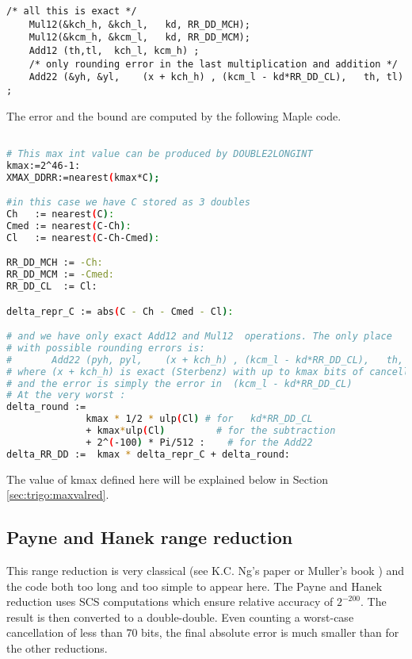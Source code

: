 \begin{lstlisting}[caption={Cody and Waite range reduction in
    double-double},firstnumber=20]
    /* all this is exact */
    Mul12(&kch_h, &kch_l,   kd, RR_DD_MCH);
    Mul12(&kcm_h, &kcm_l,   kd, RR_DD_MCM);
    Add12 (th,tl,  kch_l, kcm_h) ;
    /* only rounding error in the last multiplication and addition */ 
    Add22 (&yh, &yl,    (x + kch_h) , (kcm_l - kd*RR_DD_CL),   th, tl) ;
\end{lstlisting}


The error and the bound are computed by the following Maple code.

\begin{lstlisting}[caption={Maple script for computing constants for Cody and Waite
    double-double\label{trigo:lst:cwddrmaple}},
  language={sh}, numbers=none]% of course it's maple
%Skip a line here, I don't know why, otherwise latex eats the first line

# This max int value can be produced by DOUBLE2LONGINT
kmax:=2^46-1:
XMAX_DDRR:=nearest(kmax*C);

#in this case we have C stored as 3 doubles
Ch   := nearest(C):
Cmed := nearest(C-Ch):
Cl   := nearest(C-Ch-Cmed):

RR_DD_MCH := -Ch:
RR_DD_MCM := -Cmed:
RR_DD_CL  := Cl:

delta_repr_C := abs(C - Ch - Cmed - Cl):

# and we have only exact Add12 and Mul12  operations. The only place
# with possible rounding errors is:
#       Add22 (pyh, pyl,    (x + kch_h) , (kcm_l - kd*RR_DD_CL),   th, tl) ;
# where (x + kch_h) is exact (Sterbenz) with up to kmax bits of cancellation
# and the error is simply the error in  (kcm_l - kd*RR_DD_CL)
# At the very worst :
delta_round :=
              kmax * 1/2 * ulp(Cl) # for   kd*RR_DD_CL
              + kmax*ulp(Cl)         # for the subtraction
              + 2^(-100) * Pi/512 :    # for the Add22
delta_RR_DD :=  kmax * delta_repr_C + delta_round:
\end{lstlisting}

The value of kmax defined here will be explained below in Section
\ref{sec:trigo:maxvalred}.

\subsection{Payne and Hanek range reduction }

This range reduction is very classical (see K.C. Ng's
paper\cite{Ng1992} or Muller's book \cite{Muller97}) and the code both
too long and too simple to appear here. The Payne and Hanek reduction
uses SCS computations which ensure relative accuracy of $2^{-200}$.
The result is then converted to a double-double.  Even counting a
worst-case cancellation of less than 70 bits, the final absolute error
is much smaller than for the other reductions.

